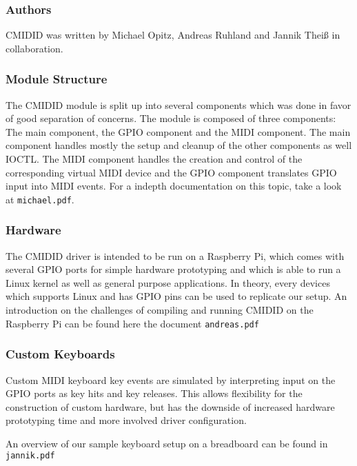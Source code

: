 \documentclass[paper=a4,fontsize=11pt,twocolumn,pagesize,bibtotoc]{scrartcl}
\begin{document}
\subsubsection{Authors}
\label{cmidid:authors}

CMIDID was written by Michael Opitz, Andreas Ruhland and Jannik Theiß in 
collaboration.

\subsubsection{Module Structure}
\label{cmidid:structure}

The CMIDID module is split up into several components which was done in 
favor of good separation of concerns. The module is composed of three 
components: The main component, the GPIO component and the MIDI component.
The main component handles mostly the setup and cleanup of the other 
components as well IOCTL. The MIDI component handles the creation and control 
of the corresponding virtual MIDI device and the GPIO component translates 
GPIO input into MIDI events. For a indepth documentation on this topic, take 
a look at \texttt{michael.pdf}.

\subsubsection{Hardware}
\label{cmidid:hardware}

The CMIDID driver is intended to be run on a Raspberry Pi, which comes with 
several GPIO ports for simple hardware prototyping and which is able to run 
a Linux kernel as well as general purpose applications. In theory, every 
devices which supports Linux and has GPIO pins can be used to replicate our 
setup. 
An introduction on the challenges of compiling and running CMIDID on the 
Raspberry Pi can be found here the document \texttt{andreas.pdf}
\subsubsection{Custom Keyboards}
\label{cmidid:keyboards}

Custom MIDI keyboard key events are simulated by interpreting input on the 
GPIO ports as key hits and key releases. This allows flexibility for the 
construction of custom hardware, but has the downside of increased hardware 
prototyping time and more involved driver configuration.

An overview of our sample keyboard setup on a breadboard can be found in \texttt{jannik.pdf}
\end{document}
